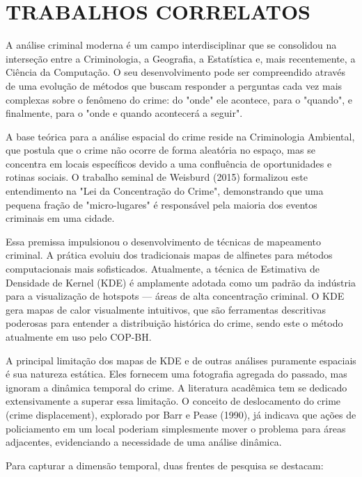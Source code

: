 \section{TRABALHOS CORRELATOS}
\label{sec:estadoarte}
A análise criminal moderna é um campo interdisciplinar que se consolidou na interseção entre a Criminologia, a Geografia, a Estatística e, mais recentemente, a Ciência da Computação. O seu desenvolvimento pode ser compreendido através de uma evolução de métodos que buscam responder a perguntas cada vez mais complexas sobre o fenômeno do crime: do "onde" ele acontece, para o "quando", e finalmente, para o "onde e quando acontecerá a seguir".

A base teórica para a análise espacial do crime reside na Criminologia Ambiental, que postula que o crime não ocorre de forma aleatória no espaço, mas se concentra em locais específicos devido a uma confluência de oportunidades e rotinas sociais. O trabalho seminal de Weisburd (2015) formalizou este entendimento na "Lei da Concentração do Crime", demonstrando que uma pequena fração de "micro-lugares" é responsável pela maioria dos eventos criminais em uma cidade.

Essa premissa impulsionou o desenvolvimento de técnicas de mapeamento criminal. A prática evoluiu dos tradicionais mapas de alfinetes para métodos computacionais mais sofisticados. Atualmente, a técnica de Estimativa de Densidade de Kernel (KDE) é amplamente adotada como um padrão da indústria para a visualização de hotspots — áreas de alta concentração criminal. O KDE gera mapas de calor visualmente intuitivos, que são ferramentas descritivas poderosas para entender a distribuição histórica do crime, sendo este o método atualmente em uso pelo COP-BH.

A principal limitação dos mapas de KDE e de outras análises puramente espaciais é sua natureza estática. Eles fornecem uma fotografia agregada do passado, mas ignoram a dinâmica temporal do crime. A literatura acadêmica tem se dedicado extensivamente a superar essa limitação. O conceito de deslocamento do crime (crime displacement), explorado por Barr e Pease (1990), já indicava que ações de policiamento em um local poderiam simplesmente mover o problema para áreas adjacentes, evidenciando a necessidade de uma análise dinâmica.

Para capturar a dimensão temporal, duas frentes de pesquisa se destacam:

